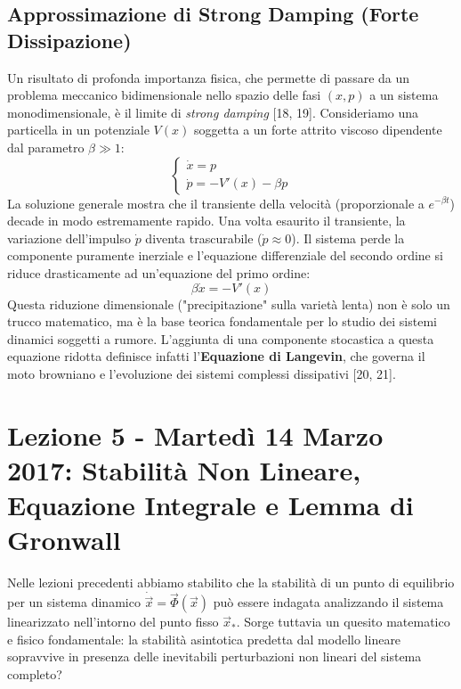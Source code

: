 \documentclass[12pt,a4paper]{article}
\begin{document}
\subsection{Approssimazione di Strong Damping (Forte Dissipazione)}
Un risultato di profonda importanza fisica, che permette di passare da un problema meccanico bidimensionale nello spazio delle fasi $(x, p)$ a un sistema monodimensionale, è il limite di \textit{strong damping} [18, 19]. Consideriamo una particella in un potenziale $V(x)$ soggetta a un forte attrito viscoso dipendente dal parametro $\beta \gg 1$:
\begin{equation}
\begin{cases}
\dot{x} = p \\
\dot{p} = -V'(x) - \beta p
\end{cases}
\end{equation}
La soluzione generale mostra che il transiente della velocità (proporzionale a $e^{-\beta t}$) decade in modo estremamente rapido. Una volta esaurito il transiente, la variazione dell'impulso $\dot{p}$ diventa trascurabile ($\dot{p} \approx 0$). Il sistema perde la componente puramente inerziale e l'equazione differenziale del secondo ordine si riduce drasticamente ad un'equazione del primo ordine:
\begin{equation}
\beta \dot{x} = -V'(x)
\end{equation}
Questa riduzione dimensionale ("precipitazione" sulla varietà lenta) non è solo un trucco matematico, ma è la base teorica fondamentale per lo studio dei sistemi dinamici soggetti a rumore. L'aggiunta di una componente stocastica a questa equazione ridotta definisce infatti l'\textbf{Equazione di Langevin}, che governa il moto browniano e l'evoluzione dei sistemi complessi dissipativi [20, 21].

\newpage
\section{Lezione 5 - Martedì 14 Marzo 2017: Stabilità Non Lineare, Equazione Integrale e Lemma di Gronwall}

Nelle lezioni precedenti abbiamo stabilito che la stabilità di un punto di equilibrio per un sistema dinamico $\dot{\vec{x}} = \vec{\Phi}(\vec{x})$ può essere indagata analizzando il sistema linearizzato nell'intorno del punto fisso $\vec{x}_*$. Sorge tuttavia un quesito matematico e fisico fondamentale: la stabilità asintotica predetta dal modello lineare sopravvive in presenza delle inevitabili perturbazioni non lineari del sistema completo?
\end{document}
